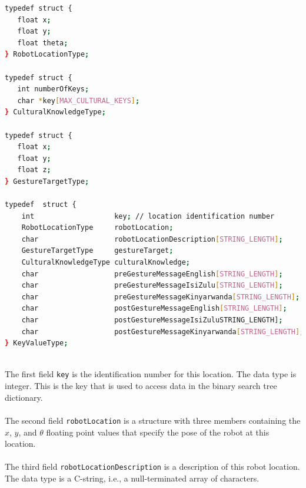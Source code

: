 \documentclass{CSSRforAfrica}
\begin{document}
\begin{lstlisting}[style=withoutNumbering, language=bash]
typedef struct {
   float x;
   float y;
   float theta;
} RobotLocationType;

typedef struct {
   int numberOfKeys;
   char *key[MAX_CULTURAL_KEYS];
} CulturalKnowledgeType;

typedef struct {
   float x;
   float y;
   float z;
} GestureTargetType;

typedef  struct {
    int                   key; // location identification number
    RobotLocationType     robotLocation;
    char                  robotLocationDescription[STRING_LENGTH];
    GestureTargetType     gestureTarget;
    CulturalKnowledgeType culturalKnowledge;
    char                  preGestureMessageEnglish[STRING_LENGTH];
    char                  preGestureMessageIsiZulu[STRING_LENGTH];
    char                  preGestureMessageKinyarwanda[STRING_LENGTH];
    char                  postGestureMessageEnglish[STRING_LENGTH];
    char                  postGestureMessageIsiZuluSTRING_LENGTH];
    char                  postGestureMessageKinyarwanda[STRING_LENGTH];
} KeyValueType;
 
\end{lstlisting}
\noindent
The first field {\small \tt key} is the identification number for this location. The data type is integer. This is the key that is used to access data in the binary search tree dictionary.
\\~\\
The second field {\small \tt robotLocation} is a structure with three members containing the $x$, $y$, and $\theta$ floating point values that specify the pose of the robot at this location. 
\\~\\
The third field {\small \tt robotLocationDescription} is a description of this robot location.  The data type  is a C-string, i.e., a null-terminated array of characters.
\\~\\
\end{document}
